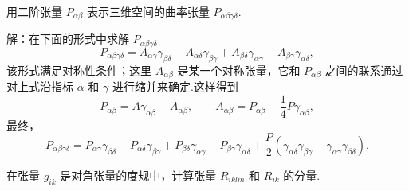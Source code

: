 \begin{xiti}

\quad 用二阶张量 $P_{\alpha\beta}$ 表示三维空间的曲率张量 $P_{\alpha\beta\gamma\delta}$.

解：在下面的形式中求解 $P_{\alpha\beta\gamma\delta}$
\begin{equation*}
  P_{\alpha\beta\gamma\delta}
  =A_{\alpha\gamma}\gamma_{\beta\delta}
  -A_{\alpha\delta}\gamma_{\beta\gamma}
  +A_{\beta\delta}\gamma_{\alpha\gamma}
  -A_{\beta\gamma}\gamma_{\alpha\delta},
\end{equation*}
该形式满足对称性条件；这里 $A_{\alpha\beta}$ 是某一个对称张量，它和 $P_{\alpha\beta}$ 之间的联系通过对上式沿指标 $\alpha$ 和 $\gamma$ 进行缩并来确定.这样得到
\begin{equation*}
  P_{\alpha\beta}=A\gamma_{\alpha\beta}+A_{\alpha\beta},\qquad
  A_{\alpha\beta}=P_{\alpha\beta}-\frac{1}{4}P\gamma_{\alpha\beta},
\end{equation*}
最终，
\begin{equation*}
  P_{\alpha\beta\gamma\delta}
  =P_{\alpha\gamma}\gamma_{\beta\delta}
  -P_{\alpha\delta}\gamma_{\beta\gamma}
  +P_{\beta\delta}\gamma_{\alpha\gamma}
  -P_{\beta\gamma}\gamma_{\alpha\delta}
  +\frac{P}{2}\left(\gamma_{\alpha\delta}\gamma_{\beta\gamma}
  -\gamma_{\alpha\gamma}\gamma_{\beta\delta}\right).
\end{equation*}

\quad 在张量 $g_{ik}$ 是对角张量的度规中，计算张量 $R_{iklm}$ 和 $R_{ik}$ 的分量.


\end{xiti}
